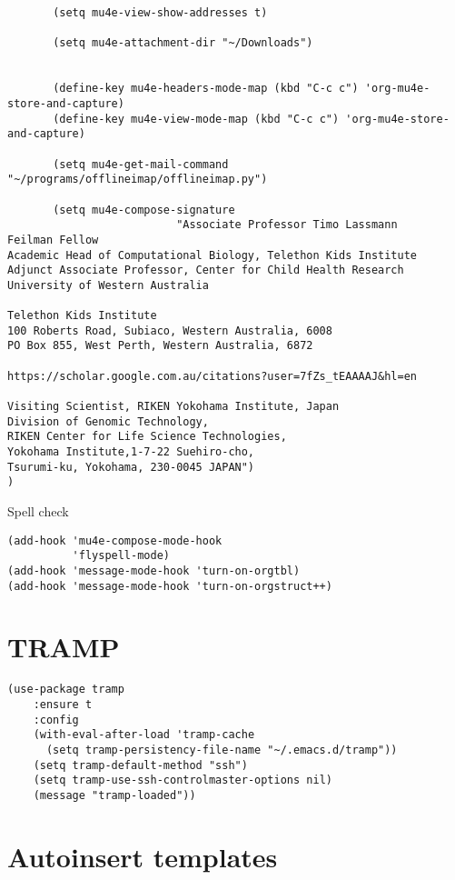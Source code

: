 \documentclass[12pt]{article}
\begin{document}
\begin{lstlisting}
       (setq mu4e-view-show-addresses t)

       (setq mu4e-attachment-dir "~/Downloads")


       (define-key mu4e-headers-mode-map (kbd "C-c c") 'org-mu4e-store-and-capture)
       (define-key mu4e-view-mode-map (kbd "C-c c") 'org-mu4e-store-and-capture)

       (setq mu4e-get-mail-command "~/programs/offlineimap/offlineimap.py")

       (setq mu4e-compose-signature
                          "Associate Professor Timo Lassmann
Feilman Fellow
Academic Head of Computational Biology, Telethon Kids Institute
Adjunct Associate Professor, Center for Child Health Research
University of Western Australia

Telethon Kids Institute
100 Roberts Road, Subiaco, Western Australia, 6008
PO Box 855, West Perth, Western Australia, 6872

https://scholar.google.com.au/citations?user=7fZs_tEAAAAJ&hl=en

Visiting Scientist, RIKEN Yokohama Institute, Japan
Division of Genomic Technology,
RIKEN Center for Life Science Technologies,
Yokohama Institute,1-7-22 Suehiro-cho,
Tsurumi-ku, Yokohama, 230-0045 JAPAN")
)
\end{lstlisting}

Spell check 

\lstset{language=Lisp,label= ,caption= ,captionpos=b,numbers=none}
\begin{lstlisting}
(add-hook 'mu4e-compose-mode-hook
          'flyspell-mode)
(add-hook 'message-mode-hook 'turn-on-orgtbl)
(add-hook 'message-mode-hook 'turn-on-orgstruct++)

\end{lstlisting}

\section{TRAMP}
\label{sec:orgbdbba4b}

\lstset{language=Lisp,label= ,caption= ,captionpos=b,numbers=none}
\begin{lstlisting}
(use-package tramp
    :ensure t
    :config
    (with-eval-after-load 'tramp-cache
      (setq tramp-persistency-file-name "~/.emacs.d/tramp"))
    (setq tramp-default-method "ssh")
    (setq tramp-use-ssh-controlmaster-options nil) 
    (message "tramp-loaded"))
\end{lstlisting}

\section{Autoinsert templates}
\label{sec:orgc1d85a9}
\end{document}
